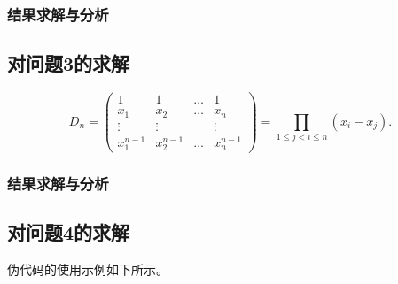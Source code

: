 \subsubsection{结果求解与分析}


\subsection{对问题3的求解}

\zhlipsum[3]

\begin{equation}\label{equ:VandermondeDet}
D_n = \begin{pmatrix}
1 & 1 & \ldots & 1 \\
x_1 & x_2 & \ldots & x_n \\
\vdots & \vdots & & \vdots \\
x_1^{n-1} & x_2^{n-1} & \ldots & x_n^{n-1}
\end{pmatrix} = \prod_{1\leq j<i\leq n}{(x_i-x_j)}.
\end{equation}

\zhlipsum[4]

\subsubsection{结果求解与分析}


\subsection{对问题4的求解}

伪代码的使用示例如下所示。

